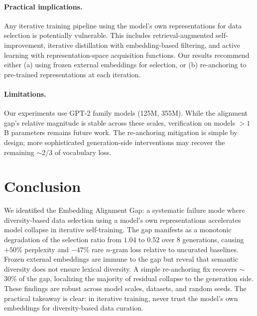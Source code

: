\documentclass[11pt,a4paper]{article}
\begin{document}
\paragraph{Practical implications.}
Any iterative training pipeline using the model's own representations for data selection is potentially vulnerable.
This includes retrieval-augmented self-improvement, iterative distillation with embedding-based filtering, and active learning with representation-space acquisition functions.
Our results recommend either (a) using frozen external embeddings for selection, or (b) re-anchoring to pre-trained representations at each iteration.

\paragraph{Limitations.}
Our experiments use GPT-2 family models (125M, 355M).
While the alignment gap's relative magnitude is stable across these scales, verification on models $>1$B parameters remains future work.
The re-anchoring mitigation is simple by design; more sophisticated generation-side interventions may recover the remaining $\sim$2/3 of vocabulary loss.

\section{Conclusion}
\label{sec:conclusion}

We identified the Embedding Alignment Gap: a systematic failure mode where diversity-based data selection using a model's own representations accelerates model collapse in iterative self-training.
The gap manifests as a monotonic degradation of the selection ratio from $1.04$ to $0.52$ over 8 generations, causing $+50\%$ perplexity and $-47\%$ rare $n$-gram loss relative to uncurated baselines.
Frozen external embeddings are immune to the gap but reveal that semantic diversity does not ensure lexical diversity.
A simple re-anchoring fix recovers $\sim$30\% of the gap, localizing the majority of residual collapse to the generation side.
These findings are robust across model scales, datasets, and random seeds.
The practical takeaway is clear: in iterative training, never trust the model's own embeddings for diversity-based data curation.



\end{document}
